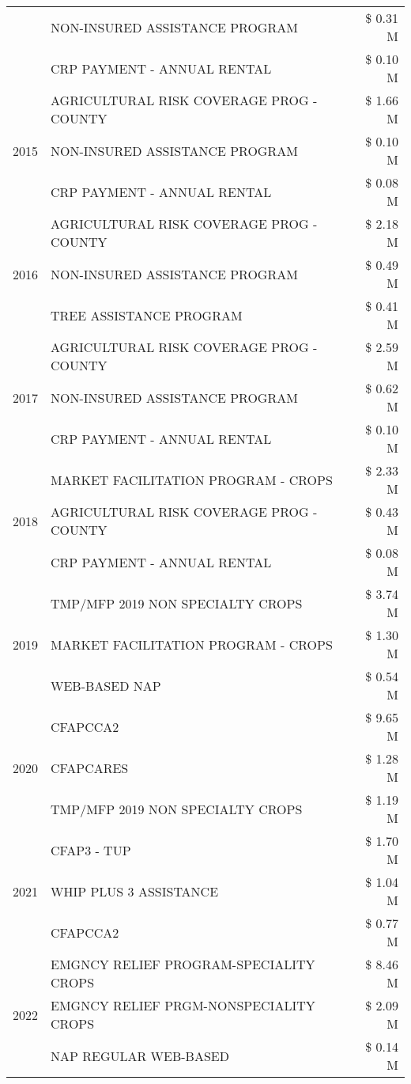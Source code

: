 \begin{tabular}{llr}
 & NON-INSURED ASSISTANCE PROGRAM & \$ 0.31 M \\
 & CRP PAYMENT - ANNUAL RENTAL & \$ 0.10 M \\
\cline{1-3}
\multirow[t]{3}{*}{2015} & AGRICULTURAL RISK COVERAGE PROG - COUNTY & \$ 1.66 M \\
 & NON-INSURED ASSISTANCE PROGRAM & \$ 0.10 M \\
 & CRP PAYMENT - ANNUAL RENTAL & \$ 0.08 M \\
\cline{1-3}
\multirow[t]{3}{*}{2016} & AGRICULTURAL RISK COVERAGE PROG - COUNTY & \$ 2.18 M \\
 & NON-INSURED ASSISTANCE PROGRAM & \$ 0.49 M \\
 & TREE ASSISTANCE PROGRAM & \$ 0.41 M \\
\cline{1-3}
\multirow[t]{3}{*}{2017} & AGRICULTURAL RISK COVERAGE PROG - COUNTY & \$ 2.59 M \\
 & NON-INSURED ASSISTANCE PROGRAM & \$ 0.62 M \\
 & CRP PAYMENT - ANNUAL RENTAL & \$ 0.10 M \\
\cline{1-3}
\multirow[t]{3}{*}{2018} & MARKET FACILITATION PROGRAM - CROPS & \$ 2.33 M \\
 & AGRICULTURAL RISK COVERAGE PROG - COUNTY & \$ 0.43 M \\
 & CRP PAYMENT - ANNUAL RENTAL & \$ 0.08 M \\
\cline{1-3}
\multirow[t]{3}{*}{2019} & TMP/MFP 2019 NON SPECIALTY CROPS & \$ 3.74 M \\
 & MARKET FACILITATION PROGRAM - CROPS & \$ 1.30 M \\
 & WEB-BASED NAP & \$ 0.54 M \\
\cline{1-3}
\multirow[t]{3}{*}{2020} & CFAPCCA2 & \$ 9.65 M \\
 & CFAPCARES & \$ 1.28 M \\
 & TMP/MFP 2019 NON SPECIALTY CROPS & \$ 1.19 M \\
\cline{1-3}
\multirow[t]{3}{*}{2021} & CFAP3 - TUP & \$ 1.70 M \\
 & WHIP PLUS 3 ASSISTANCE & \$ 1.04 M \\
 & CFAPCCA2 & \$ 0.77 M \\
\cline{1-3}
\multirow[t]{3}{*}{2022} & EMGNCY RELIEF PROGRAM-SPECIALITY CROPS & \$ 8.46 M \\
 & EMGNCY RELIEF PRGM-NONSPECIALITY CROPS & \$ 2.09 M \\
 & NAP REGULAR WEB-BASED & \$ 0.14 M \\
\cline{1-3}
\bottomrule
\end{tabular}
